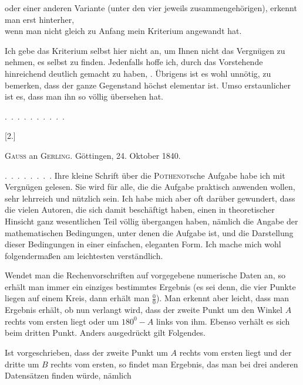 %
oder einer anderen Variante (unter den vier jeweils zusammengehörigen), erkennt man erst hinterher,\\\hspace*{2em}wenn man nicht gleich zu Anfang mein Kriterium angewandt hat.

Ich gebe das Kriterium selbst hier nicht an, um Ihnen nicht das Vergnügen zu nehmen, es selbst zu finden. Jedenfalls hoffe ich, durch das Vorstehende hinreichend deutlich gemacht zu haben, . Übrigens ist es wohl unnötig, zu bemerken, dass der ganze Gegenstand höchst elementar ist. Umso erstaunlicher ist es, dass man ihn so völlig übersehen hat.

\mbox{. . . . . . . . . .}

\begin{center}[2.]\end{center}

\begin{center}\textsc{Gauss} an \textsc{Gerling}. Göttingen, 24. Oktober 1840.\end{center}

\indent \mbox{. . . . . . . .} Ihre kleine Schrift über die \textsc{Pothenot}sche Aufgabe habe ich mit Vergnügen gelesen. Sie wird für alle, die die Aufgabe praktisch anwenden wollen, sehr lehrreich und nützlich sein. Ich habe mich aber oft darüber gewundert, dass die vielen Autoren, die sich damit beschäftigt haben, einen in theoretischer Hinsicht ganz wesentlichen Teil völlig übergangen haben, nämlich die Angabe der mathematischen Bedingungen, unter denen die Aufgabe  ist, und die Darstellung dieser Bedingungen in einer einfachen, eleganten Form. Ich mache mich wohl folgendermaßen am leichtesten verständlich.

Wendet man die Rechenvorschriften auf vorgegebene numerische Daten an, so erhält man immer ein einziges bestimmtes Ergebnis (es sei denn, die vier Punkte liegen auf einem Kreis, dann erhält man $\frac{0}{0}$). Man erkennt aber leicht, dass man  Ergebnis erhält, ob nun verlangt wird, dass der zweite Punkt um den Winkel $A$ rechts vom ersten liegt oder um $180^0-A$ links von ihm. Ebenso verhält es sich beim dritten Punkt. Anders ausgedrückt gilt Folgendes.

Ist vorgeschrieben, dass der zweite Punkt um $A$ rechts vom ersten liegt und der dritte um $B$ rechts vom ersten, so findet man  Ergebnis, das man bei drei anderen Datensätzen finden würde, nämlich
